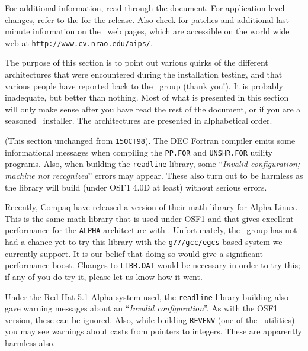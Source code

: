 
\medskip\noindent
For additional information, read through the document.  For
application-level changes, refer to the  for the
release.  Also check for patches and additional last-minute information
on the \AIPS\ web pages, which are accessible on the world wide web at
{\tt http://www.cv.nrao.edu/aips/}.

\medskip{}

The purpose of this section is to point out various quirks of the
different architectures that were encountered during the installation
testing, and that various people have reported back to the \AIPS\ group
(thank you!).  It is probably inadequate, but better than nothing.  Most
of what is presented in this section will only make sense after you have
read the rest of the document, or if you are a seasoned \AIPS\
installer.  The architectures are presented in alphabetical order.

\medskip{}

(This section unchanged from {\tt 15OCT98}).  %
The DEC Fortran compiler emits some informational messages when
compiling the {\tt PP.FOR} and {\tt UNSHR.FOR} utility programs.  Also,
when building the {\tt readline} library, some ``{\it Invalid
configuration; machine not recognized\/}'' errors may appear.  These
also turn out to be harmless as the library will build (under OSF1 4.0D
at least) without serious errors.

\medskip{}

Recently, Compaq have released a version of their math library for Alpha
Linux.  This is the same math library that is used under OSF1 and that
gives excellent performance for the {\tt ALPHA} architecture with \AIPS.
Unfortunately, the \AIPS\ group has not had a chance yet to try this
library with the {\tt g77/gcc/egcs} based system we currently support.
It is our belief that doing so would give a significant performance
boost.  Changes to {\tt LIBR.DAT} would be necessary in order to try
this; if any of you do try it, please let us know how it went.

Under the Red Hat 5.1 Alpha system used, the {\tt readline} library
building also gave warning messages about an ``{\it Invalid
configuration\/}''.  As with the OSF1 version, these can be ignored.
Also, while building {\tt REVENV} (one of the \SYSU\ utilities) you may
see warnings about casts from pointers to integers.  These are
apparently harmless also.

